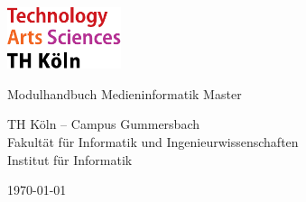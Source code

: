 
\begin{titlepage}

	\includegraphics[width=0.25\textwidth]{../../../assets/logo_th_koeln.pdf}

	\vspace{2cm}
	{\Huge\raggedright Modulhandbuch Medieninformatik Master\par}
	\vspace{1cm}
	{\Large TH Köln – Campus Gummersbach \\ Fakultät für Informatik und Ingenieurwissenschaften \\ Institut für Informatik\par}

	\vfill

	{\large \today\par}
\end{titlepage}
